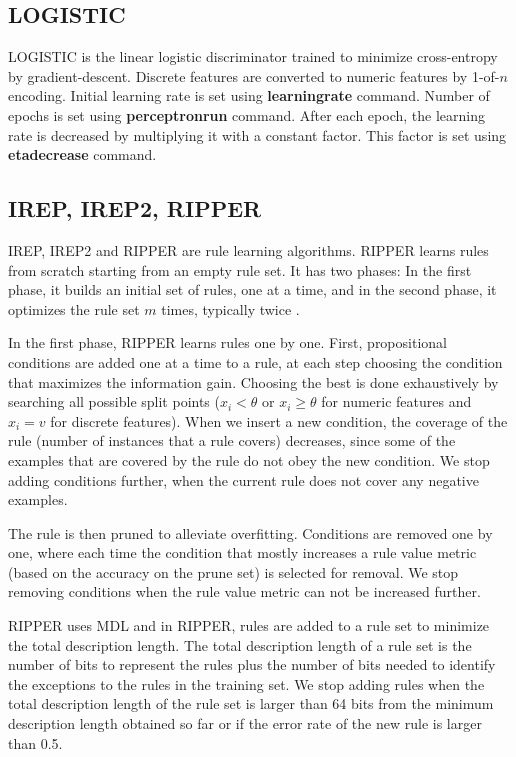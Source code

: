 \documentclass[a4paper,12pt]{book}
\begin{document}
\subsection{LOGISTIC}
LOGISTIC is the linear logistic discriminator trained to minimize cross-entropy by gradient-descent. Discrete features are converted to numeric features by 1-of-$n$ encoding. Initial learning rate is set using {\bf learningrate} command. Number of epochs is set using {\bf perceptronrun} command. After each epoch, the learning rate is decreased by multiplying it with a constant factor. This factor is set using {\bf etadecrease} command.

\subsection{IREP, IREP2, RIPPER}
IREP, IREP2 and RIPPER are rule learning algorithms. RIPPER learns rules from scratch starting from an empty rule set. It has two phases: In the first phase, it builds an initial set of rules, one at a time, and in the second phase, it optimizes the rule set $m$ times, typically twice \cite{cohen95}. 

In the first phase, RIPPER learns rules one by one. First, propositional conditions are added one at a time to a rule, at each step choosing the condition that maximizes the information gain. Choosing the best is done exhaustively by  searching all possible split points ($x_i<\theta$ or $x_i\geq\theta$ for numeric features and $x_i = v$ for discrete features). When we insert a new condition, the coverage of the rule (number of instances that a rule covers) decreases, since some of the examples that are covered by the rule do not obey the new condition. We stop adding conditions further, when the current rule does not cover any negative examples. 

The rule is then pruned to alleviate overfitting. Conditions are removed one by one, where each time the condition that mostly increases a rule value metric (based on the accuracy on the prune set) is selected for removal. We stop removing conditions when the rule value metric can not be increased further. 

RIPPER uses MDL and in RIPPER, rules are added to a rule set to minimize the total description length. The total description length of a rule set is the number of bits to represent the rules plus the number of bits needed to identify the exceptions to the rules in the training set. We stop adding rules when the total description length of the rule set is larger than 64 bits from the minimum description length obtained so far or if the error rate of the new rule is larger than 0.5. 
\end{document}
